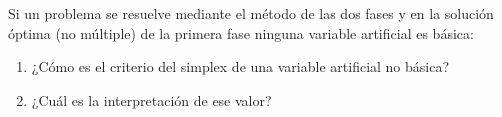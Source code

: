 Si un problema se resuelve mediante el método de las dos fases y en la solución óptima (no múltiple) de la primera fase ninguna variable artificial es básica:
\begin{enumerate}[label=\alph*)]
    \item ¿Cómo es el criterio del simplex de una variable artificial no básica?
    \item ¿Cuál es la interpretación de ese valor?
\end{enumerate}